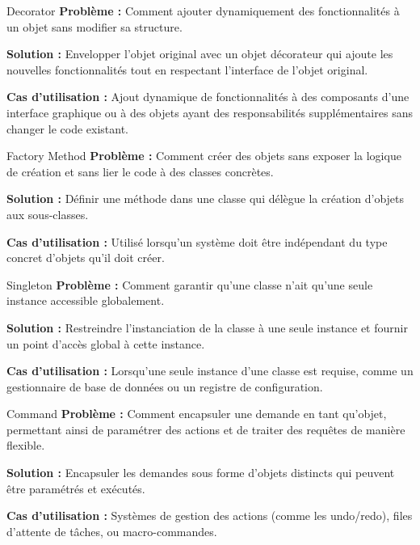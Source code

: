 \documentclass[aspectratio=169]{beamer}
\begin{document}
\begin{frame}{Decorator}
    \textbf{Problème :} 
    Comment ajouter dynamiquement des fonctionnalités à un objet sans modifier sa structure.

    \textbf{Solution :} 
    Envelopper l'objet original avec un objet décorateur qui ajoute les nouvelles fonctionnalités tout en respectant l'interface de l'objet original.

    \textbf{Cas d'utilisation :}
    Ajout dynamique de fonctionnalités à des composants d'une interface graphique ou à des objets ayant des responsabilités supplémentaires sans changer le code existant.
\end{frame}

\begin{frame}{Factory Method}
    \textbf{Problème :} 
    Comment créer des objets sans exposer la logique de création et sans lier le code à des classes concrètes.

    \textbf{Solution :} 
    Définir une méthode dans une classe qui délègue la création d'objets aux sous-classes.

    \textbf{Cas d'utilisation :}
    Utilisé lorsqu'un système doit être indépendant du type concret d'objets qu'il doit créer.
\end{frame}

\begin{frame}{Singleton}
    \textbf{Problème :} 
    Comment garantir qu'une classe n'ait qu'une seule instance accessible globalement.

    \textbf{Solution :} 
    Restreindre l'instanciation de la classe à une seule instance et fournir un point d'accès global à cette instance.

    \textbf{Cas d'utilisation :}
    Lorsqu'une seule instance d'une classe est requise, comme un gestionnaire de base de données ou un registre de configuration.
\end{frame}

\begin{frame}{Command}
    \textbf{Problème :} 
    Comment encapsuler une demande en tant qu'objet, permettant ainsi de paramétrer des actions et de traiter des requêtes de manière flexible.

    \textbf{Solution :} 
    Encapsuler les demandes sous forme d'objets distincts qui peuvent être paramétrés et exécutés.

    \textbf{Cas d'utilisation :}
    Systèmes de gestion des actions (comme les undo/redo), files d'attente de tâches, ou macro-commandes.
\end{frame}
\end{document}
